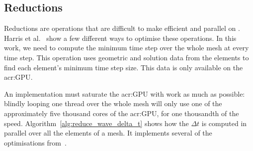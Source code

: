 \subsection{Reductions}\label{subsection:graphics_processing_units:implementation:reductions}

Reductions are operations that are difficult to make efficient and parallel on .
Harris et al.~\cite{Harris2007} show a few different ways to optimise these operations. In this
work, we need to compute the minimum time step over the whole mesh at every time step. This
operation uses geometric and solution data from the elements to find each element's minimum time
step size. This data is only available on the \acrshort{acr:GPU}. 

An implementation must saturate the \acrshort{acr:GPU} with work as much as possible: blindly
looping one thread over the whole mesh will only use one of the approximately five thousand cores of
the \acrshort{acr:GPU}, for one thousandth of the speed. Algorithm~\ref{alg:reduce_wave_delta_t}
shows how the \(\Delta t\) is computed in parallel over all the elements of a mesh. It implements
several of the optimisations from~\cite{Harris2007}.

